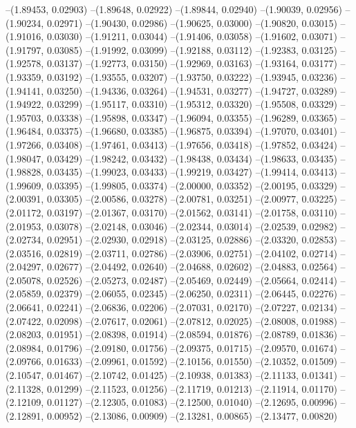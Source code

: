 --(1.89453, 0.02903)
--(1.89648, 0.02922)
--(1.89844, 0.02940)
--(1.90039, 0.02956)
--(1.90234, 0.02971)
--(1.90430, 0.02986)
--(1.90625, 0.03000)
--(1.90820, 0.03015)
--(1.91016, 0.03030)
--(1.91211, 0.03044)
--(1.91406, 0.03058)
--(1.91602, 0.03071)
--(1.91797, 0.03085)
--(1.91992, 0.03099)
--(1.92188, 0.03112)
--(1.92383, 0.03125)
--(1.92578, 0.03137)
--(1.92773, 0.03150)
--(1.92969, 0.03163)
--(1.93164, 0.03177)
--(1.93359, 0.03192)
--(1.93555, 0.03207)
--(1.93750, 0.03222)
--(1.93945, 0.03236)
--(1.94141, 0.03250)
--(1.94336, 0.03264)
--(1.94531, 0.03277)
--(1.94727, 0.03289)
--(1.94922, 0.03299)
--(1.95117, 0.03310)
--(1.95312, 0.03320)
--(1.95508, 0.03329)
--(1.95703, 0.03338)
--(1.95898, 0.03347)
--(1.96094, 0.03355)
--(1.96289, 0.03365)
--(1.96484, 0.03375)
--(1.96680, 0.03385)
--(1.96875, 0.03394)
--(1.97070, 0.03401)
--(1.97266, 0.03408)
--(1.97461, 0.03413)
--(1.97656, 0.03418)
--(1.97852, 0.03424)
--(1.98047, 0.03429)
--(1.98242, 0.03432)
--(1.98438, 0.03434)
--(1.98633, 0.03435)
--(1.98828, 0.03435)
--(1.99023, 0.03433)
--(1.99219, 0.03427)
--(1.99414, 0.03413)
--(1.99609, 0.03395)
--(1.99805, 0.03374)
--(2.00000, 0.03352)
--(2.00195, 0.03329)
--(2.00391, 0.03305)
--(2.00586, 0.03278)
--(2.00781, 0.03251)
--(2.00977, 0.03225)
--(2.01172, 0.03197)
--(2.01367, 0.03170)
--(2.01562, 0.03141)
--(2.01758, 0.03110)
--(2.01953, 0.03078)
--(2.02148, 0.03046)
--(2.02344, 0.03014)
--(2.02539, 0.02982)
--(2.02734, 0.02951)
--(2.02930, 0.02918)
--(2.03125, 0.02886)
--(2.03320, 0.02853)
--(2.03516, 0.02819)
--(2.03711, 0.02786)
--(2.03906, 0.02751)
--(2.04102, 0.02714)
--(2.04297, 0.02677)
--(2.04492, 0.02640)
--(2.04688, 0.02602)
--(2.04883, 0.02564)
--(2.05078, 0.02526)
--(2.05273, 0.02487)
--(2.05469, 0.02449)
--(2.05664, 0.02414)
--(2.05859, 0.02379)
--(2.06055, 0.02345)
--(2.06250, 0.02311)
--(2.06445, 0.02276)
--(2.06641, 0.02241)
--(2.06836, 0.02206)
--(2.07031, 0.02170)
--(2.07227, 0.02134)
--(2.07422, 0.02098)
--(2.07617, 0.02061)
--(2.07812, 0.02025)
--(2.08008, 0.01988)
--(2.08203, 0.01951)
--(2.08398, 0.01914)
--(2.08594, 0.01876)
--(2.08789, 0.01836)
--(2.08984, 0.01796)
--(2.09180, 0.01756)
--(2.09375, 0.01715)
--(2.09570, 0.01674)
--(2.09766, 0.01633)
--(2.09961, 0.01592)
--(2.10156, 0.01550)
--(2.10352, 0.01509)
--(2.10547, 0.01467)
--(2.10742, 0.01425)
--(2.10938, 0.01383)
--(2.11133, 0.01341)
--(2.11328, 0.01299)
--(2.11523, 0.01256)
--(2.11719, 0.01213)
--(2.11914, 0.01170)
--(2.12109, 0.01127)
--(2.12305, 0.01083)
--(2.12500, 0.01040)
--(2.12695, 0.00996)
--(2.12891, 0.00952)
--(2.13086, 0.00909)
--(2.13281, 0.00865)
--(2.13477, 0.00820)
